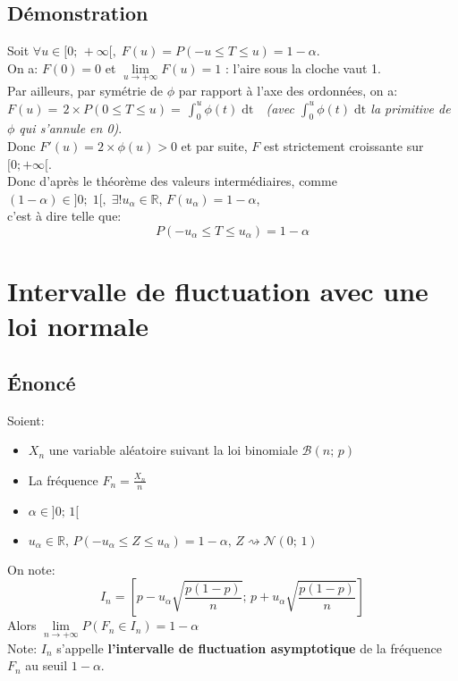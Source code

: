 \documentclass[12px]{article}
\begin{document}
	\subsection{Démonstration}
	Soit $\forall u\in [0; \, +\infty[,\; F(u) = P(-u\leq T\leq u) = 1-\alpha$.\\
	On a: $F(0)=0$ et $\lim\limits_{u\rightarrow +\infty}F(u)=1$ : l'aire sous la cloche vaut 1.\\
	Par ailleurs, par symétrie de $\phi$ par rapport à l'axe des ordonnées, on a:\\
	$F(u) =\, 2\times P(0\leq T\leq u) =\, \int_{0}^{u}\phi (t)\; \mathrm{dt}$\ \  \emph{(avec $\int_{0}^{u}\phi (t)\; \mathrm{dt}$ la primitive de $\phi$ qui s'annule en 0)}.\\
	Donc $F'(u) = 2\times \phi (u) >0$ et par suite, $F$ est strictement croissante sur $[0; +\infty[$.\\
	Donc d'après le théorème des valeurs intermédiaires, comme $(1-\alpha)\in ]0;\; 1[,\; \exists ! u_\alpha\in\mathbb{R},\, F(u_\alpha) = 1-\alpha$,\\
	c'est à dire telle que:
	\begin{displaymath}
		P(-u_\alpha\leq T \leq u_\alpha) = 1-\alpha
	\end{displaymath}
	
	\section{Intervalle de fluctuation avec une loi normale}
	
	\subsection{\'Enoncé}
	Soient:
	\begin{itemize}
		\item $X_n$ une variable aléatoire suivant la loi binomiale $\mathcal{B}(n;\, p)$
		\item La fréquence $F_n=\frac{X_n}{n}$
		\item $\alpha\in ]0;\, 1[$
		\item $u_\alpha\in\mathbb{R},\, P(-u_\alpha\leq Z\leq u_\alpha)=1-\alpha,\, Z\rightsquigarrow \mathcal{N}(0;\, 1)$
	\end{itemize}
	On note:
	\begin{displaymath}
		I_n = \left[  p-u_\alpha\sqrt{\frac{p(1-p)}{n}} ;\, p+u_\alpha\sqrt{\frac{p(1-p)}{n}} \right]
	\end{displaymath}
	Alors $\lim\limits_{n\rightarrow +\infty}P(F_n\in I_n)=1-\alpha$\\
	Note: $I_n$ s'appelle \textbf{l'intervalle de fluctuation asymptotique} de la fréquence $F_n$ au seuil $1-\alpha $.
	
\end{document}
